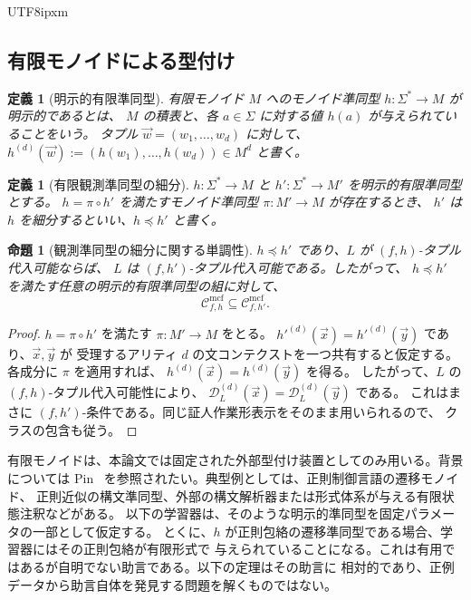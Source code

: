 \documentclass[10pt,a4paper]{article}
\newtheorem{proposition}[theorem]{命題}
\newtheorem{definition}[theorem]{定義}
\theoremstyle{remark}
\newcommand{\Cmcf}[2]{\mathcal{C}^{\mathrm{mcf}}_{#1,#2}}
\newcommand{\D}{\mathcal{D}}
\newcommand{\tuple}[1]{\vec{#1}}
\begin{document}
\begin{CJK}{UTF8}{ipxm}
\subsection{有限モノイドによる型付け}

\begin{definition}[明示的有限準同型]
有限モノイド \(M\) へのモノイド準同型 \(h\colon\Sigma^*\to M\) が\emph{明示的}であるとは、
\(M\) の積表と、各 \(a\in\Sigma\) に対する値 \(h(a)\) が与えられていることをいう。
タプル \(\tuple w=(w_1,\ldots,w_d)\) に対して、
\(h^{(d)}(\tuple w):=(h(w_1),\ldots,h(w_d))\in M^d\) と書く。
\end{definition}

\begin{definition}[有限観測準同型の細分]
\label{def:h-refinement}
\(h\colon\Sigma^*\to M\) と \(h'\colon\Sigma^*\to M'\) を明示的有限準同型とする。
\(h=\pi\circ h'\) を満たすモノイド準同型 \(\pi\colon M'\to M\) が存在するとき、
\(h'\) は \(h\) を\emph{細分する}といい、\(h\preceq h'\) と書く。
\end{definition}

\begin{proposition}[観測準同型の細分に関する単調性]
\label{prop:h-refinement-monotonicity}
\(h\preceq h'\) であり、\(L\) が \((f,h)\)-タプル代入可能ならば、
\(L\) は \((f,h')\)-タプル代入可能である。したがって、
\(h\preceq h'\) を満たす任意の明示的有限準同型の組に対して、
\[
  \Cmcf{f}{h}\subseteq \Cmcf{f}{h'} .
\]
\end{proposition}

\begin{proof}
\(h=\pi\circ h'\) を満たす \(\pi\colon M'\to M\) をとる。
\(h'^{(d)}(\tuple x)=h'^{(d)}(\tuple y)\) であり、\(\tuple x,\tuple y\) が
受理するアリティ \(d\) の文コンテクストを一つ共有すると仮定する。
各成分に \(\pi\) を適用すれば、
\(h^{(d)}(\tuple x)=h^{(d)}(\tuple y)\) を得る。
したがって、\(L\) の \((f,h)\)-タプル代入可能性により、
\(\D_L^{(d)}(\tuple x)=\D_L^{(d)}(\tuple y)\) である。
これはまさに \((f,h')\)-条件である。同じ証人作業形表示をそのまま用いられるので、
クラスの包含も従う。
\end{proof}

有限モノイドは、本論文では固定された外部型付け装置としてのみ用いる。背景については
Pin~\cite{Pin1986} を参照されたい。典型例としては、正則制御言語の遷移モノイド、
正則近似の構文準同型、外部の構文解析器または形式体系が与える有限状態注釈などがある。
以下の学習器は、そのような明示的準同型を固定パラメータの一部として仮定する。
とくに、\(h\) が正則包絡の遷移準同型である場合、学習器にはその正則包絡が有限形式で
与えられていることになる。これは有用ではあるが自明でない助言である。以下の定理はその助言に
相対的であり、正例データから助言自体を発見する問題を解くものではない。


\end{CJK}
\end{document}
